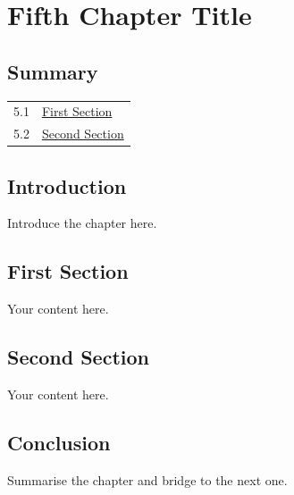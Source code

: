 \chapter{Fifth Chapter Title}

\section*{Summary}
\begin{center}
\begin{tabular}{cl}
  5.1 & \hyperref[sec:ch5-first]{First Section} \\
  5.2 & \hyperref[sec:ch5-second]{Second Section} \\
\end{tabular}
\end{center}

\section*{Introduction}

Introduce the chapter here.

\vfill
\newpage

\section{First Section}\label{sec:ch5-first}

Your content here.

\section{Second Section}\label{sec:ch5-second}

Your content here.

\section*{Conclusion}

Summarise the chapter and bridge to the next one.

\newpage
